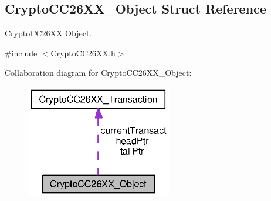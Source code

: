 \subsection{Crypto\-C\-C26\-X\-X\-\_\-\-Object Struct Reference}
\label{struct_crypto_c_c26_x_x___object}


Crypto\-C\-C26\-X\-X Object.  




{\ttfamily \#include $<$Crypto\-C\-C26\-X\-X.\-h$>$}



Collaboration diagram for Crypto\-C\-C26\-X\-X\-\_\-\-Object\-:
\nopagebreak
\begin{figure}[H]
\begin{center}
\leavevmode
\includegraphics[width=180pt]{struct_crypto_c_c26_x_x___object__coll__graph}
\end{center}
\end{figure}
